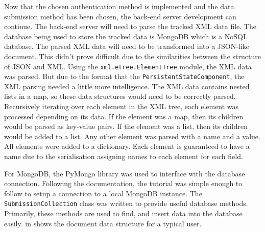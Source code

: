 Now that the chosen authentication method is implemented and the data submission method has been chosen, the back-end server development can continue. The back-end server will need to parse the tracked XML data file. The database being used to store the tracked data is MongoDB which is a NoSQL database. The parsed XML data will need to be transformed into a JSON-like document. This didn't prove difficult due to the similarities between the structure of JSON and XML. Using the \texttt{xml.etree.ElementTree} module, the XML data was parsed. But due to the format that the \texttt{PersistentStateComponent}, the XML parsing needed a little more intelligence. The XML data contains nested lists in a map, so these data structures would need to be correctly parsed. Recursively iterating over each element in the XML tree, each element was processed depending on its data. If the element was a map, then its children would be parsed as key-value pairs. If the element was a list, then its children would be added to a list. Any other element was parsed with a name and a value. All elements were added to a dictionary. Each element is guaranteed to have a name due to the serialisation assigning names to each element for each field.

For MongoDB, the PyMongo library was used to interface with the database connection\cite{PyMongoDocs}. Following the documentation, the tutorial was simple enough to follow to setup a connection to a local MongoDB instance. The \texttt{SubmissionCollection} class was written to provide useful database methods. Primarily, these methods are used to find, and insert data into the database easily.  in  shows the document data structure for a typical user.

